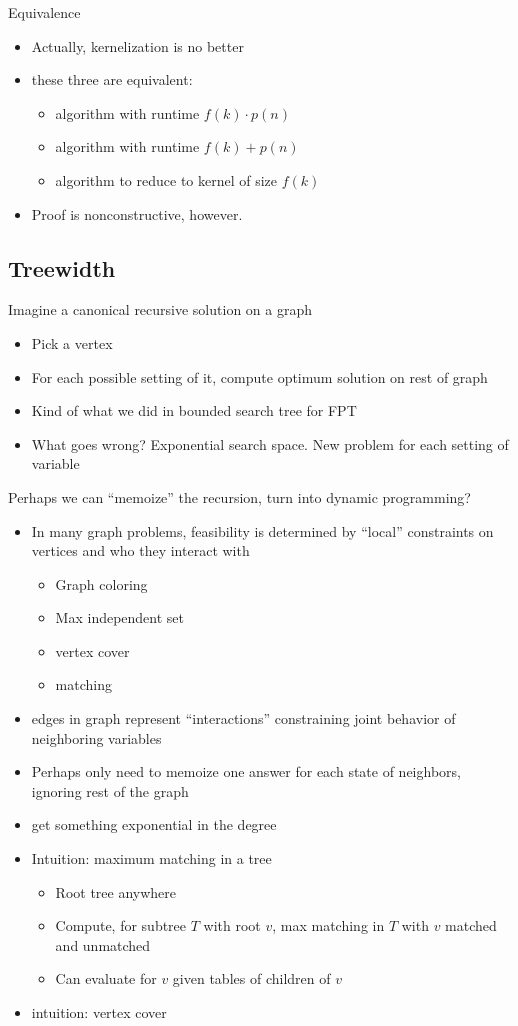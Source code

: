 \documentclass{article}
\begin{document}
Equivalence
\begin{itemize}
\item Actually, kernelization is no better
\item these three are equivalent:
\begin{itemize}
\item algorithm with runtime $f(k)\cdot p(n)$
\item algorithm with runtime $f(k)+p(n)$
\item algorithm to reduce to kernel of size $f(k)$
\end{itemize}
\item Proof is nonconstructive, however.
\end{itemize}



\subsection{Treewidth}
Imagine a canonical recursive solution on a graph
\begin{itemize}
\item Pick a vertex
\item For each possible setting of it, compute optimum solution on
  rest of graph
\item Kind of what we did in bounded search tree for FPT
\item What goes wrong?  Exponential search space.  New problem for
  each setting of variable
\end{itemize}

Perhaps we can ``memoize'' the recursion, turn into dynamic
  programming?
\begin{itemize}
\item In many graph problems, feasibility is determined by ``local''
   constraints on vertices and who they interact with
\begin{itemize}
\item Graph coloring
\item Max independent set
\item vertex cover
\item matching
\end{itemize}
\item edges in graph represent ``interactions'' constraining joint
   behavior of neighboring variables
\item Perhaps only need to memoize one answer for each state of
neighbors, ignoring rest of the graph
\item get something exponential in the degree
\item Intuition: maximum matching in a tree
\begin{itemize}
\item Root tree anywhere
\item Compute, for subtree $T$ with root $v$, max matching in $T$ with $v$
  matched and unmatched
\item Can evaluate for $v$ given tables of children of $v$
\end{itemize}
\item intuition: vertex cover
\end{itemize}
\end{document}
